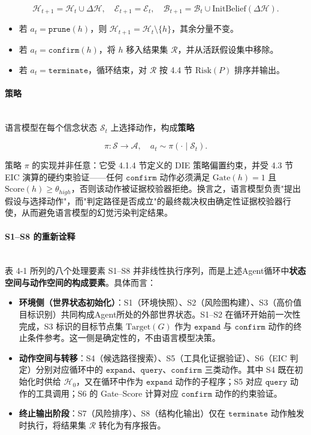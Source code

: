 \documentclass[a4paper,12pt]{ctexart}
\begin{document}
\[
\mathcal{H}_{t+1} = \mathcal{H}_t \cup \Delta\mathcal{H}, \quad \mathcal{E}_{t+1} = \mathcal{E}_t, \quad \mathcal{B}_{t+1} = \mathcal{B}_t \cup \text{InitBelief}(\Delta\mathcal{H}).
\]

\begin{itemize}[leftmargin=*]
\item 若 $a_t = \texttt{prune}(h)$，则 $\mathcal{H}_{t+1} = \mathcal{H}_t \setminus \{h\}$，其余分量不变。
\item 若 $a_t = \texttt{confirm}(h)$，将 $h$ 移入结果集 $\mathcal{R}$，并从活跃假设集中移除。
\item 若 $a_t = \texttt{terminate}$，循环结束，对 $\mathcal{R}$ 按 4.4 节 $\text{Risk}(P)$ 排序并输出。
\end{itemize}

\paragraph{策略}\mbox{}\\

语言模型在每个信念状态 $\mathcal{S}_t$ 上选择动作，构成\textbf{策略}

\[
\pi: \mathcal{S} \to \mathcal{A}, \quad a_t \sim \pi(\cdot \mid \mathcal{S}_t).
\]

策略 $\pi$ 的实现并非任意：它受 4.1.4 节定义的 DIE 策略偏置约束，并受 4.3 节 EIC 演算的硬约束验证——任何 $\texttt{confirm}$ 动作必须满足 $\text{Gate}(h)=1$ 且 $\text{Score}(h) \geq \theta_{high}$，否则该动作被证据校验器拒绝。换言之，语言模型负责"提出假设与选择动作"，而"判定路径是否成立"的最终裁决权由确定性证据校验器行使，从而避免语言模型的幻觉污染判定结果。

\paragraph{S1–S8 的重新诠释}\mbox{}\\

表 4-1 所列的八个处理要素 S1–S8 并非线性执行序列，而是上述Agent循环中\textbf{状态空间与动作空间的构成要素}。具体而言：

\begin{itemize}[leftmargin=*]
\item \textbf{环境侧（世界状态初始化）}：S1（环境快照）、S2（风险图构建）、S3（高价值目标识别）共同构成Agent所处的外部世界状态。S1–S2 在循环开始前一次性完成，S3 标识的目标节点集 $\text{Target}(G)$ 作为 $\texttt{expand}$ 与 $\texttt{confirm}$ 动作的终止条件参考。这一侧是确定性的，不由语言模型决策。
\item \textbf{动作空间与转移}：S4（候选路径搜索）、S5（工具化证据验证）、S6（EIC 判定）分别对应循环中的 $\texttt{expand}$、$\texttt{query}$、$\texttt{confirm}$ 三类动作。其中 S4 既在初始化时供给 $\mathcal{H}_0$，又在循环中作为 $\texttt{expand}$ 动作的子程序；S5 对应 $\texttt{query}$ 动作的工具调用；S6 的 Gate–Score 计算对应 $\texttt{confirm}$ 动作的约束验证。
\item \textbf{终止输出阶段}：S7（风险排序）、S8（结构化输出）仅在 $\texttt{terminate}$ 动作触发时执行，将结果集 $\mathcal{R}$ 转化为有序报告。
\end{itemize}
\end{document}
